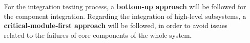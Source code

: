 For the integration testing process, a \textbf{bottom-up approach} will be followed for the component integration. Regarding the integration of high-level subsystems, a \textbf{critical-module-first approach} will be followed, in order to avoid issues related to the failures of core components of the whole system.


